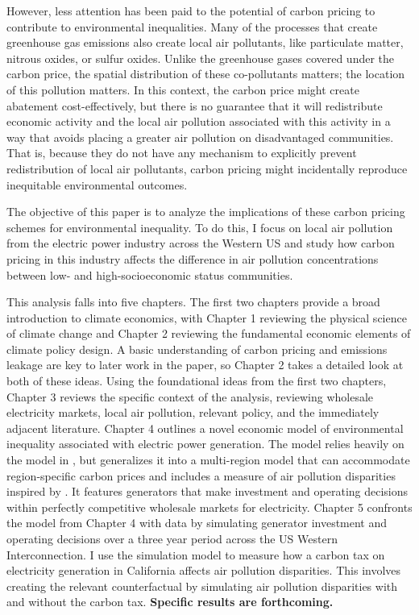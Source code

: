However, less attention has been paid to the potential of carbon pricing to contribute to environmental inequalities. Many of the processes that create greenhouse gas emissions also create local air pollutants, like particulate matter, nitrous oxides, or sulfur oxides. Unlike the greenhouse gases covered under the carbon price, the spatial distribution of these co-pollutants matters; the location of this pollution matters. In this context, the carbon price might create abatement cost-effectively, but there is no guarantee that it will redistribute economic activity and the local air pollution associated with this activity in a way that avoids placing a greater air pollution on disadvantaged communities. That is, because they do not have any mechanism to explicitly prevent redistribution of local air pollutants, carbon pricing might incidentally reproduce inequitable environmental outcomes.

The objective of this paper is to analyze the implications of these carbon pricing schemes for environmental inequality. To do this, I focus on local air pollution from the electric power industry across the Western US and study how carbon pricing in this industry affects the difference in air pollution concentrations between low- and high-socioeconomic status communities. 

This analysis falls into five chapters. The first two chapters provide a broad introduction to climate economics, with Chapter 1 reviewing the physical science of climate change and Chapter 2 reviewing the fundamental economic elements of climate policy design. A basic understanding of carbon pricing and emissions leakage are key to later work in the paper, so Chapter 2 takes a detailed look at both of these ideas. Using the foundational ideas from the first two chapters, Chapter 3 reviews the specific context of the analysis, reviewing wholesale electricity markets, local air pollution, relevant policy, and the immediately adjacent literature. Chapter 4 outlines a novel economic model of environmental inequality associated with electric power generation. The model relies heavily on the model in \cite{weber2021dynamic}, but generalizes it into a multi-region model that can accommodate region-specific carbon prices and includes a measure of air pollution disparities inspired by \cite{hernandez2023environmental}. It features generators that make investment and operating decisions within perfectly competitive wholesale markets for electricity. Chapter 5 confronts the model from Chapter 4 with data by simulating generator investment and operating decisions over a three year period across the US Western Interconnection. I use the simulation model to measure how a carbon tax on electricity generation in California affects air pollution disparities. This involves creating the relevant counterfactual by simulating air pollution disparities with and without the carbon tax. \textbf{Specific results are forthcoming.}

